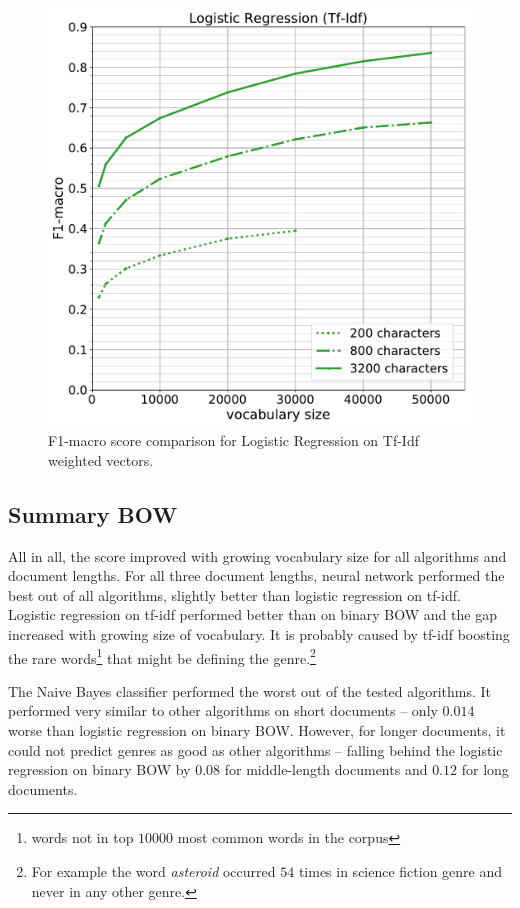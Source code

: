 \begin{figure}[h]
	\centering
	\includegraphics[height=0.3\textheight]{img/05_tfidf}
	\caption{F1-macro score comparison for Logistic Regression on Tf-Idf weighted vectors.}
	\label{fig:05_tfidf}
\end{figure}




\subsection{Summary BOW}

All in all, the score improved with growing vocabulary size for all algorithms and document lengths. For all three document lengths, neural network performed the best out of all algorithms, slightly better than logistic regression on tf-idf. Logistic regression on tf-idf performed better than on binary BOW and the gap increased with growing size of vocabulary. It is probably caused by tf-idf boosting the rare words\footnote{words not in top $10000$ most common words in the corpus} that might be defining the genre.\footnote{For example the word \textit{asteroid} occurred $54$ times in science fiction genre and never in any other genre.}

The Naive Bayes classifier performed the worst out of the tested algorithms. It performed very similar to other algorithms on short documents -- only $0.014$ worse than logistic regression on binary BOW. However, for longer documents, it could not predict genres as good as other algorithms -- falling behind the logistic regression on binary BOW by $0.08$ for middle-length documents and $0.12$ for long documents.

